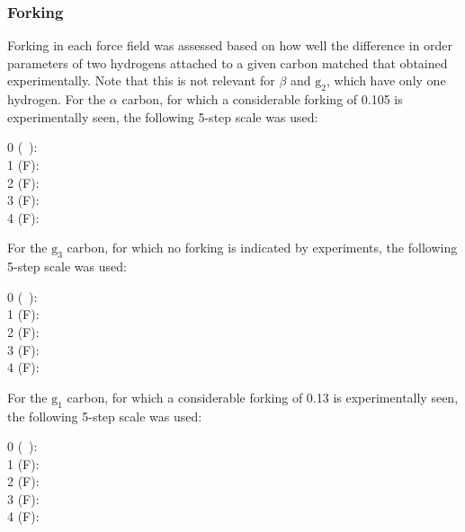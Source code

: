 \documentclass[journal=jpcbfk,manuscript=article]{achemso}
\begin{document}
\subsubsection*{Forking}
Forking in each force field was assessed based on how well the difference in order parameters of two hydrogens attached to a given carbon matched that obtained experimentally. Note that this is not relevant for $\beta$ and $\mathrm{g_2}$, which have only one hydrogen. For the $\alpha$ carbon,  for which a considerable forking of 0.105 is experimentally seen, the following 5-step scale was used:
\begin{description}
\item [0 (~):] 
%
\item [1 ({\textsf{\tiny F}}):] 
%
\item [2  ({\textsf{\small F}}):] 
%
\item [3 ({\textsf{\large F}}):] 
%
\item [4 ({\textsf{\Large F}}):] 
\end{description}
%
For the $\mathrm{g_3}$ carbon, for which no forking is indicated by experiments, the following 5-step scale was used:
%
\begin{description}
\item [0 (~):] 
%
\item [1 ({\textsf{\tiny F}}):] 
%
\item [2  ({\textsf{\small F}}):] 
%
\item [3 ({\textsf{\large F}}):] 
%
\item [4 ({\textsf{\Large F}}):] 
\end{description}
%
For the $\mathrm{g_1}$ carbon, for which a considerable forking of 0.13 is experimentally seen, the following 5-step scale was used:
%
\begin{description}
\item [0 (~):] 
%
\item [1 ({\textsf{\tiny F}}):] 
%
\item [2  ({\textsf{\small F}}):] 
%
\item [3 ({\textsf{\large F}}):] 
%
\item [4 ({\textsf{\Large F}}):] 
\end{description}
\end{document}

